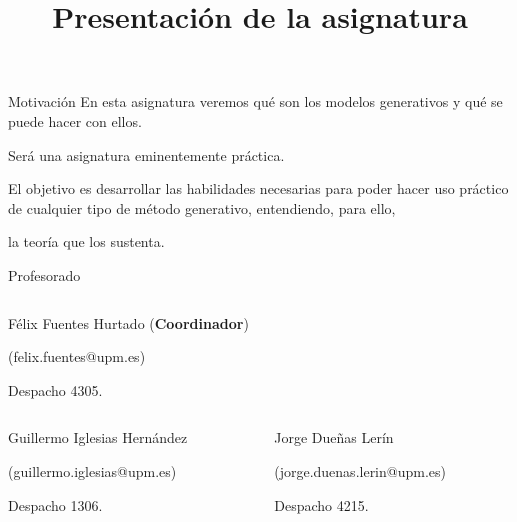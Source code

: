 



\title{Presentación de la asignatura}


\maketitle

\begin{frame}{Motivación}
En esta asignatura veremos qué son los \alert{modelos generativos} y qué se puede hacer con ellos.

Será una asignatura eminentemente \alert{práctica}.

El objetivo es desarrollar las habilidades necesarias para poder hacer uso práctico de cualquier tipo de método generativo, entendiendo, para ello,

\centering
\alert{\huge la teoría que los sustenta}.
\end{frame}

\begin{frame}{Profesorado}

\begin{columns}[T]
\begin{column}{.98\textwidth}
\centering
\alert{\Large Félix Fuentes Hurtado (\textbf{Coordinador})}

({\color{blue}felix.fuentes@upm.es})

Despacho 4305.
\end{column}
\end{columns}

\hfill

\begin{columns}[T]
\begin{column}{.49\textwidth}
\alert{\Large Guillermo Iglesias Hernández}

({\color{blue}guillermo.iglesias@upm.es})

Despacho 1306.
\end{column}
\hfill
\begin{column}{.49\textwidth}
\alert{\Large Jorge Dueñas Lerín}

({\color{blue}jorge.duenas.lerin@upm.es})

Despacho 4215.
\end{column}
\end{columns}
\end{frame}

